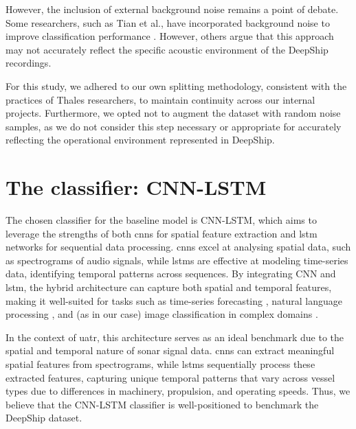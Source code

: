 However, the inclusion of external background noise remains a point of debate. Some researchers, such as Tian et al., have incorporated background noise to improve classification performance \cite{tian_joint_2023}. However, others argue that this approach may not accurately reflect the specific acoustic environment of the DeepShip recordings.

For this study, we adhered to our own splitting methodology, consistent with the practices of Thales researchers, to maintain continuity across our internal projects. Furthermore, we opted not to augment the dataset with random noise samples, as we do not consider this step necessary or appropriate for accurately reflecting the operational environment represented in DeepShip.

\section{The classifier: CNN-LSTM}

The chosen classifier for the baseline model is CNN-LSTM, which aims to leverage the strengths of both \acrshort{cnn}s for spatial feature extraction and \acrshort{lstm} networks for sequential data processing. \acrshort{cnn}s excel at analysing spatial data, such as spectrograms of audio signals, while \acrshort{lstm}s are effective at modeling time-series data, identifying temporal patterns across sequences. By integrating CNN and \acrshort{lstm}, the hybrid architecture can capture both spatial and temporal features, making it well-suited for tasks such as time-series forecasting \cite{kim_predicting_2019, lu_cnn-lstm-based_2020}, natural language processing \cite{wang_dimensional_2016, umer_fake_2020}, and (as in our case) image classification in complex domains \cite{vankdothu_brain_2022, islam_combined_2020}. 

In the context of \acrshort{uatr}, this architecture serves as an ideal benchmark due to the spatial and temporal nature of sonar signal data. \acrshort{cnn}s can extract meaningful spatial features from spectrograms, while \acrshort{lstm}s sequentially process these extracted features, capturing unique temporal patterns that vary across vessel types due to differences in machinery, propulsion, and operating speeds. Thus, we believe that the CNN-LSTM classifier is well-positioned to benchmark the DeepShip dataset. 

